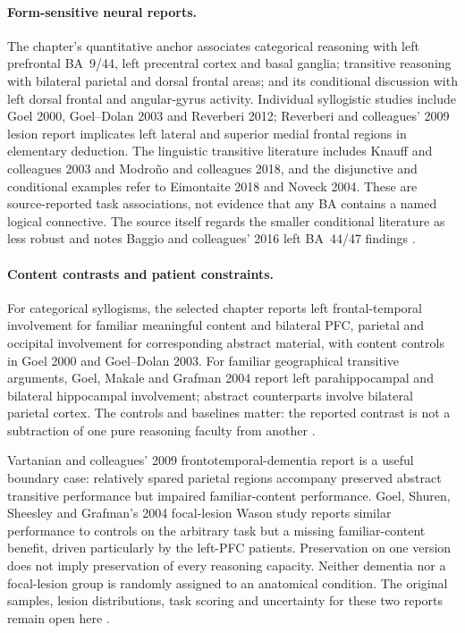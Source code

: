 \paragraph{Form-sensitive neural reports.}
The chapter's quantitative anchor associates categorical reasoning with
left prefrontal BA~9/44, left precentral cortex and basal ganglia;
transitive reasoning with bilateral parietal and dorsal frontal areas;
and its conditional discussion with left dorsal frontal and angular-gyrus
activity. Individual syllogistic studies include Goel 2000, Goel--Dolan
2003 and Reverberi 2012; Reverberi and colleagues' 2009 lesion report
implicates left lateral and superior medial frontal regions in elementary
deduction. The linguistic transitive literature includes Knauff and
colleagues 2003 and Modro\~no and colleagues 2018, and the disjunctive and
conditional examples refer to Eimontaite 2018 and Noveck 2004. These are
source-reported task associations, not evidence that any BA contains a
named logical connective. The source itself regards the smaller conditional
literature as less robust and notes Baggio and colleagues' 2016 left
BA~44/47 findings \cite[pp.~118--120]{Goel2021RationalityBrain}.

\paragraph{Content contrasts and patient constraints.}
For categorical syllogisms, the selected chapter reports left
frontal-temporal involvement for familiar meaningful content and bilateral
PFC, parietal and occipital involvement for corresponding abstract material,
with content controls in Goel 2000 and Goel--Dolan 2003. For familiar
geographical transitive arguments, Goel, Makale and Grafman 2004 report
left parahippocampal and bilateral hippocampal involvement; abstract
counterparts involve bilateral parietal cortex. The controls and baselines
matter: the reported contrast is not a subtraction of one pure reasoning
faculty from another \cite[p.~121, fig.~1.4.1b--f]{Goel2021RationalityBrain}.

Vartanian and colleagues' 2009 frontotemporal-dementia report is a useful
boundary case: relatively spared parietal regions accompany preserved
abstract transitive performance but impaired familiar-content performance.
Goel, Shuren, Sheesley and Grafman's 2004 focal-lesion Wason study reports
similar performance to controls on the arbitrary task but a missing
familiar-content benefit, driven particularly by the left-PFC patients.
Preservation on one version does not imply preservation of every reasoning
capacity. Neither dementia nor a focal-lesion group is randomly assigned
to an anatomical condition. The original samples, lesion distributions,
task scoring and uncertainty for these two reports remain open here
\cite[p.~121]{Goel2021RationalityBrain}.

